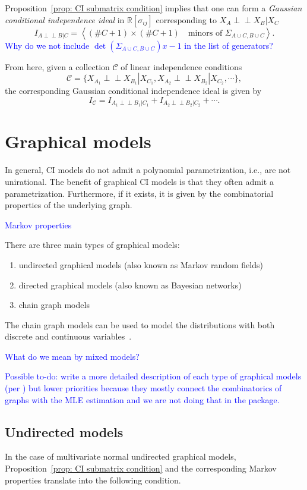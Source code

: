\documentclass[10pt,a4paper]{article}
\newcommand{\indep}{\perp \!\!\! \perp}
\begin{document}
Proposition~\ref{prop: CI submatrix condition} implies that one can form a \emph{Gaussian conditional independence ideal} in $\mathbb{R}[\sigma_{ij}]$ corresponding to $X_A\indep X_B|X_C$
\[I_{A \indep B|C}=\left\langle (\#C+1)\times (\#C+1) \quad \text{minors of } \Sigma_{A\cup C,B \cup C} \right \rangle.\]
\textcolor{blue}{Why do we not include $\det(\Sigma_{A\cup C,B \cup C})x-1$ in the list of generators?}

From here, given a collection $\mathcal{C}$ of linear independence conditions 
\[\mathcal{C}=\{X_{A_1}\indep X_{B_1}|X_{C_1},X_{A_2}\indep X_{B_2}|X_{C_2},\cdots\},\]
the corresponding Gaussian conditional independence ideal is given by
\[I_\mathcal{C}=I_{A_1\indep B_1|C_1}+I_{A_2\indep B_2|C_2}+\cdots.\]


\section{Graphical models}
In general, CI models do not admit a polynomial parametrization, i.e., are not unirational. The benefit of graphical CI models is that they often admit a parametrization. Furthermore, if it exists, it is given  by the combinatorial properties of the underlying graph.

\textcolor{blue}{Markov properties \cite[Section 3.2]{lauritzen1996graphical}}

There are three main types of graphical models:
\begin{enumerate}
\item undirected graphical models (also known as Markov random fields) 
\item directed graphical models (also known as Bayesian networks)
\item chain graph models 
\end{enumerate}
The chain graph models can be used to model the distributions with both discrete and continuous variables~\cite[Chapter 6.1.1]{lauritzen1996graphical}.


 
\textcolor{blue}{What do we mean by mixed models? }

\textcolor{blue}{Possible to-do: write a more detailed description of each type of graphical models (per \cite[Chapter 3]{drton2008lectures}) but lower priorities because they mostly connect the combinatorics of graphs with the MLE estimation and we are not doing that in the package.}

\subsection{Undirected models}
In the case of multivariate normal undirected graphical models, Proposition~\ref{prop: CI submatrix condition} and the corresponding Markov properties translate into the following condition.
\end{document}
